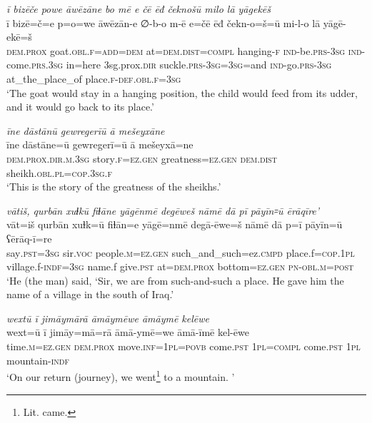 \ea \label{ZB.54}
\textit{ī bizēče powe āwēzāne bo mē e čē ēđ čeknošū milo lā yāgekēš} \\ 
\gll ī bizē=č=e p=o=we āwēzān-e ∅-b-o m-ē e=čē ēđ čekn-o=š=ū mi-l-o lā yāgē-ekē=š \\ 
 \textsc{dem.prox} goat\textsc{.obl}\textsc{.f}\textsc{=add}\textsc{=dem} at=\textsc{dem.dist}\textsc{=compl} hanging\textsc{-f} \textsc{ind-}be\textsc{.prs}\textsc{-3sg} \textsc{ind-}come\textsc{.prs}\textsc{.3sg} in=here 3sg.prox\textsc{.dir} suckle\textsc{.prs}\textsc{-3sg}\textsc{=3sg}=and \textsc{ind-}go\textsc{.prs}\textsc{-3sg} at\_the\_place\_of place\textsc{.f}\textsc{-def}\textsc{.obl}\textsc{.f}\textsc{=3sg} \\ 
\glt `The goat would stay in a hanging position, the child would feed from its udder, and it would go back to its place.'
\z 
 
\ea \label{ZB.58}
\textit{īne dāstānū gewregerīū ā mešeyxāne} \\ 
\gll īne dāstāne=ū gewregerī=ū ā mešeyxā=ne \\ 
 \textsc{dem.prox}\textsc{.dir}\textsc{.m}\textsc{.3sg} story\textsc{.f}\textsc{\textsc{=ez.gen}} greatness\textsc{\textsc{=ez.gen}} \textsc{dem.dist} sheikh\textsc{.obl}\textsc{.pl}\textsc{=cop}\textsc{.3sg}\textsc{.f} \\ 
\glt `This is the story of the greatness of the sheikhs.'
\z 
 
\ea \label{ZQ.5}
\textit{vātiš, qurbān xuɫkū fiɫāne yāgēnmē degēweš nāmē dā pī pāyīn꞊ū ērāqīre'} \\ 
\gll vāt=iš qurbān xuɫk=ū fiɫān=e yāgē=nmē degā-ēwe=š nāmē dā p=ī pāyīn=ū ʕērāq-ī=re \\ 
 say\textsc{.pst}\textsc{=3sg} sir.\textsc{voc} people\textsc{.m}\textsc{=ez.gen} such\_and\_such=ez\textsc{.cmpd} place.f\textsc{=cop}\textsc{.\textsc{1pl}} village.f\textsc{-indf}\textsc{=3sg} name.f give\textsc{.pst} at=\textsc{dem.prox} bottom\textsc{=ez.gen} \textsc{pn}\textsc{-obl}\textsc{.m}\textsc{=\textsc{post}} \\ 
\glt `He (the man) said, ‘Sir, we are from such-and-such a place. He gave him the name of a village in the south of Iraq.'
\z 
 
\ea \label{ZQ.11}
\textit{wextū ī jimāymārā āmāymēwe āmāymē kelēwe} \\ 
\gll wext=ū ī jimāy=mā=rā āmā-ymē=we āmā-īmē kel-ēwe \\ 
 time\textsc{.m}\textsc{=ez.gen} \textsc{dem.prox} move\textsc{.inf}\textsc{=\textsc{1pl}}\textsc{=\textsc{povb}} come\textsc{.pst} \textsc{1pl}\textsc{=compl} come\textsc{.pst} \textsc{1pl} mountain\textsc{-indf} \\ 
\glt `On our return (journey), we went\footnote{Lit. came.}  to a mountain. '
\z 
 
